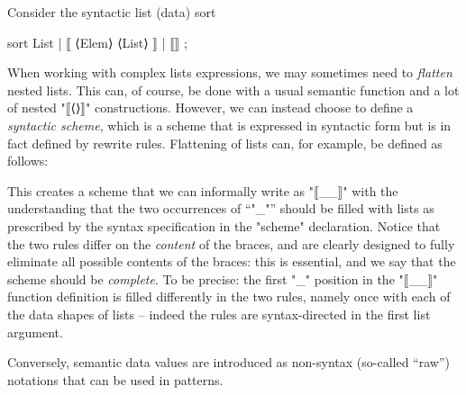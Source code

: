 \documentclass[11pt]{article} %
\begin{document}
\begin{example}\label{ex:append}
  Consider the syntactic list (data) sort
  \begin{hacs}[xleftmargin=\parindent,xrightmargin=\parindent]
sort List | ⟦ ⟨Elem⟩ ⟨List⟩ ⟧ | ⟦⟧ ;
  \end{hacs}
  When working with complex lists expressions, we may sometimes need to \emph{flatten} nested
  lists. This can, of course, be done with a usual semantic function and a lot of nested "⟦⟨⟩⟧"
  constructions. However, we can instead choose to define a \emph{syntactic scheme}, which is a
  scheme that is expressed in syntactic form but is in fact defined by rewrite rules. Flattening of
  lists can, for example, be defined as follows:
  This creates a scheme that we can informally write as "⟦{_}_⟧" with the understanding that the
  two occurrences of ``"_"'' should be filled with lists as prescribed by the syntax specification
  in the "scheme" declaration. Notice that the two rules differ on the \emph{content} of the braces,
  and are clearly designed to fully eliminate all possible contents of the braces: this is
  essential, and we say that the scheme should be \emph{complete}. To be precise: the first "_"
  position in the "⟦{_}_⟧" function definition is filled differently in the two rules, namely once
  with each of the data shapes of lists -- indeed the rules are syntax-directed in the first list
  argument.
\end{example}

Conversely, semantic data values are introduced as non-syntax (so-called ``raw'') notations that can
be used in patterns.
\end{document}
